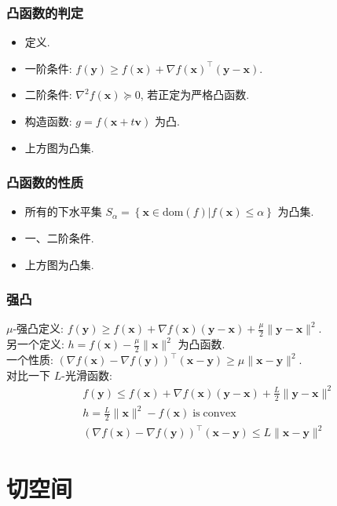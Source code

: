 \documentclass[lang = cn]{elegantpaper}
\begin{document}
\subsubsection{凸函数的判定}
\noindent
\begin{itemize}
    \item 定义.
    \item 一阶条件: $f(\bm{y}) \ge f(\bm{x}) + \nabla f(\bm{x})^\top(\bm{y}-\bm{x})$.
    \item 二阶条件: $\nabla^2 f(\bm{x}) \succeq 0$, 若正定为严格凸函数.
    \item 构造函数: $g = f(\bm{x} + t\bm{v})$ 为凸.
    \item 上方图为凸集.
\end{itemize}
\subsubsection{凸函数的性质}
\noindent
\begin{itemize}
    \item 所有的下水平集 $S_\alpha = \left\{\bm{x}\in\mathrm{dom}(f)|f(\bm{x}) \le \alpha\right\}$ 为凸集.
    \item 一、二阶条件.
    \item 上方图为凸集.
\end{itemize}
\subsubsection{强凸}
\noindent
$\mu$-强凸定义: $f(\bm{y}) \ge f(\bm{x}) + \nabla f(\bm{x})(\bm{y}-\bm{x}) + \frac{\mu}{2}\|\bm{y}-\bm{x}\|^2$.\\
另一个定义: $h = f(\bm{x}) - \frac{\mu}{2}\|\bm{x}\|^2$ 为凸函数.\\
一个性质: $(\nabla f(\bm{x}) - \nabla f(\bm{y}))^\top (\bm{x}-\bm{y}) \ge \mu \|\bm{x}-\bm{y}\|^2$.\\
对比一下 $L$-光滑函数:
\begin{equation*}
\begin{aligned}
    &f(\bm{y}) \le f(\bm{x}) + \nabla f(\bm{x})(\bm{y}-\bm{x}) + \frac{L}{2}\|\bm{y}-\bm{x}\|^2\\
    &h = \frac{L}{2}\|\bm{x}\|^2 - f(\bm{x}) \;\mathrm{is\;convex}\\
    &(\nabla f(\bm{x}) - \nabla f(\bm{y}))^\top (\bm{x}-\bm{y}) \le L \|\bm{x}-\bm{y}\|^2
\end{aligned}
\end{equation*}
\section{切空间}
\end{document}
